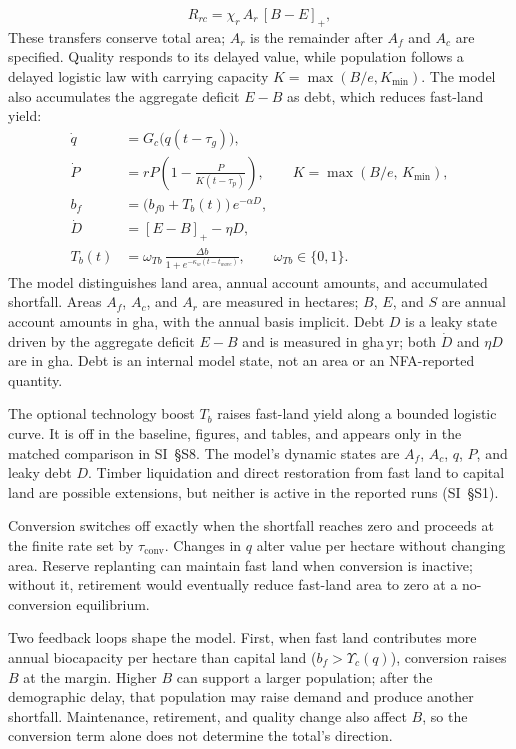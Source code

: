 \documentclass[preprint,12pt,authoryear]{elsarticle}
\newcommand{\pos}[1]{\left[#1\right]_+}
\newcommand{\Ups}{\Upsilon_c}
\newcommand{\tconv}{\tau_{\mathrm{conv}}}
\begin{document}
\begin{equation}\label{eq:Rrc}
R_{rc}=\chi_r\,A_r\,\pos{B-E},
\end{equation}
These transfers conserve total area; $A_r$ is the remainder after $A_f$ and $A_c$ are specified. Quality responds to its delayed value, while population follows a delayed logistic law \citep{Pearl1925,Hutchinson1948} with carrying capacity $K=\max(B/e,K_{\min})$. The model also accumulates the aggregate deficit $E-B$ as debt, which reduces fast-land yield:
\begin{align}
\dot q&=G_c\big(q(t-\tau_g)\big),\label{eq:q}\\
\dot P&=rP\left(1-\frac{P}{K(t-\tau_p)}\right),\qquad K=\max(B/e,\,K_{\min}),\label{eq:P}\\
b_f&=\big(b_{f0}+T_b(t)\big)\,e^{-\alpha D},\label{eq:bf}\\
\dot D&=\pos{E-B}-\eta D,\label{eq:D}\\
T_b(t)&=\omega_{Tb}\,\frac{\Delta b}{1+e^{-\kappa_w(t-t_{wave})}},\qquad \omega_{Tb}\in\{0,1\}.\label{eq:Tb}
\end{align}
The model distinguishes land area, annual account amounts, and accumulated shortfall. Areas $A_f$, $A_c$, and $A_r$ are measured in hectares; $B$, $E$, and $S$ are annual account amounts in gha, with the annual basis implicit. Debt $D$ is a leaky state driven by the aggregate deficit $E-B$ and is measured in gha\,yr; both $\dot D$ and $\eta D$ are in gha. Debt is an internal model state, not an area or an NFA-reported quantity.

The optional technology boost $T_b$ raises fast-land yield along a bounded logistic curve. It is off in the baseline, figures, and tables, and appears only in the matched comparison in SI~\S S8. The model's dynamic states are $A_f$, $A_c$, $q$, $P$, and leaky debt $D$. Timber liquidation and direct restoration from fast land to capital land are possible extensions, but neither is active in the reported runs (SI~\S S1).

Conversion switches off exactly when the shortfall reaches zero and proceeds at the finite rate set by $\tconv$. Changes in $q$ alter value per hectare without changing area. Reserve replanting can maintain fast land when conversion is inactive; without it, retirement would eventually reduce fast-land area to zero at a no-conversion equilibrium.

Two feedback loops shape the model. First, when fast land contributes more annual biocapacity per hectare than capital land ($b_f>\Ups(q)$), conversion raises $B$ at the margin. Higher $B$ can support a larger population; after the demographic delay, that population may raise demand and produce another shortfall. Maintenance, retirement, and quality change also affect $B$, so the conversion term alone does not determine the total's direction.
\end{document}
